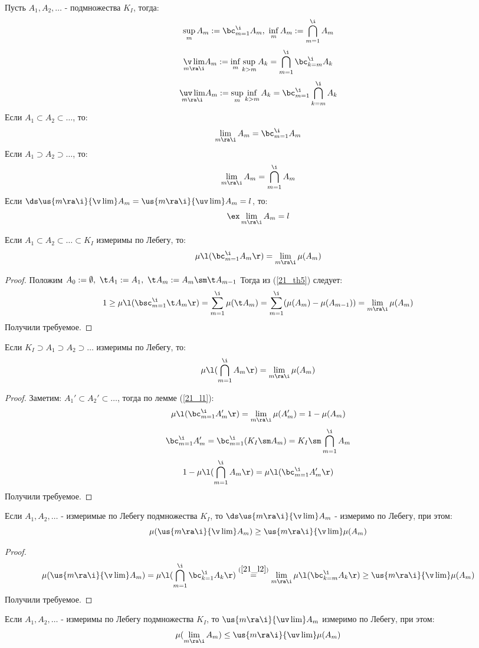 \begin{definition}
	Пусть $A_1,A_2,\dots$ - подмножества $K_I$, тогда:
	\[\sup_mA_m:=\bc_{m=1}^\i A_m,\ \inf_mA_m:=\bigcap_{m=1}^\i A_m\]
	\[\underset{m\ra\i}{\v\lim}A_m:=\inf_m\sup_{k>m}A_k=\bigcap_{m=1}^\i\bc_{k=m}^\i A_k\]
	\[\underset{m\ra\i}{\uv\lim}A_m:=\sup_m\inf_{k>m}A_k=\bc_{m=1}^\i\bigcap_{k=m}^\i A_k\]
	Если $A_1\subset A_2\subset\dots$, то:
	\[\lim_{m\ra\i}A_m=\bc_{m=1}^\i A_m\]
	Если $A_1\supset A_2\supset\dots$, то:
	\[\lim_{m\ra\i}A_m=\bigcap_{m=1}^\i A_m\]
	Если $\ds\us{m\ra\i}{\v\lim}A_m=\us{m\ra\i}{\uv\lim}A_m=l$, то:
	\[\ex\lim_{m\ra\i}A_m=l\]
\end{definition}
\begin{lemma}\label{21_l1}
	Если $A_1\subset A_2\subset\dots\subset K_I$ измеримы по Лебегу, то:
	\[\mu\l(\bc_{m=1}^\i A_m\r)=\lim_{m\ra\i}\mu(A_m)\]
\end{lemma}
\begin{proof}
	Положим $A_0:=\emptyset,\ \t A_1:=A_1,\ \t A_m:=A_m\sm \t A_{m-1}$
	Тогда из (\ref{21_th5}) следует:
	\[1\ge\mu\l(\bsc_{m=1}^\i\t A_m\r)=\sum_{m=1}^\i\mu(\t A_m)=\sum_{m=1}^\i(\mu(A_m)-\mu(A_{m-1}))=\lim_{m\ra\i}\mu(A_m)\]
	Получили требуемое.
\end{proof}
\begin{lemma}\label{21_l2}
	Если $K_I\supset A_1\supset A_2\supset\dots$ измеримы по Лебегу, то:
	\[\mu\l(\bigcap_{m=1}^\i A_m\r)=\lim_{m\ra\i}\mu(A_m)\]
\end{lemma}
\begin{proof}
	Заметим: $A_1'\subset A_2'\subset\dots$, тогда по лемме (\ref{21_l1}):
	\[\mu\l(\bc_{m=1}^\i A_m'\r)=\lim_{m\ra\i}\mu(A_m')=1-\mu(A_m)\]
	\[\bc_{m=1}^\i A_m'=\bc_{m=1}^\i(K_I\sm A_m)=K_I\sm\bigcap_{m=1}^\i A_m\]
	\[1-\mu\l(\bigcap_{m=1}^\i A_m\r)=\mu\l(\bc_{m=1}^\i A_m'\r)\]
	Получили требуемое.
\end{proof}
\begin{lemma}\label{21_l3}
	Если $A_1,A_2,\dots$ - измеримые по Лебегу подмножества $K_I$, то $\ds\us{m\ra\i}{\v\lim}A_m$ - измеримо по Лебегу, при этом: \[\mu(\us{m\ra\i}{\v\lim}A_m)\ge\us{m\ra\i}{\v\lim}\mu(A_m)\]
\end{lemma}
\begin{proof}
	\[\mu(\us{m\ra\i}{\v\lim}A_m)=\mu\l(\bigcap_{m=1}^\i\bc_{k=1}^\i A_k\r)\overset{(\ref{21_l2})}{=}\lim_{m\ra\i}\mu\l(\bc_{k=m}^\i A_k\r)\ge\us{m\ra\i}{\v\lim}\mu(A_m)\]
	Получили требуемое.
\end{proof}
\begin{lemma}\label{21_l4}
	Если $A_1,A_2,\dots$ - измеримы по Лебегу подмножества $K_I$, то $\us{m\ra\i}{\uv\lim}A_m$ измеримо по Лебегу, при этом: \[\mu(\lim_{m\ra\i}A_m)\le\us{m\ra\i}{\uv\lim}\mu(A_m)\]
\end{lemma}
